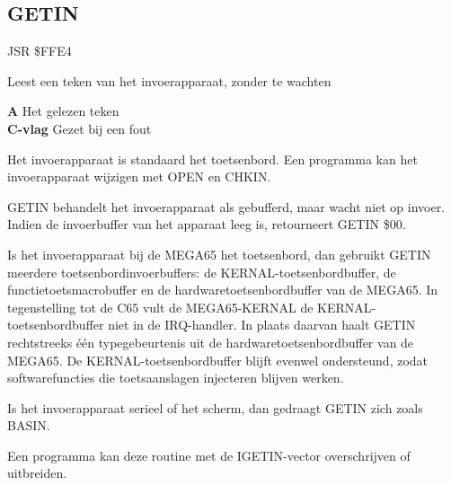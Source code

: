 \subsection{GETIN}
\label{KERNAL Jump Table!GETIN}
\begin{description}[leftmargin=2cm,style=nextline]
    \item [Adres:] JSR \$FFE4    \item [Omschrijving:] Leest een teken van het invoerapparaat, zonder te wachten    \item [Uitvoer:]        \textbf{A} Het gelezen teken \\        \textbf{C-vlag} Gezet bij een fout    \item [Opmerkingen:]        Het invoerapparaat is standaard het toetsenbord. Een programma kan het invoerapparaat wijzigen met OPEN en CHKIN.

        GETIN behandelt het invoerapparaat als gebufferd, maar wacht niet op invoer. Indien de invoerbuffer van het apparaat leeg is, retourneert GETIN \$00.

        Is het invoerapparaat bij de MEGA65 het toetsenbord, dan gebruikt GETIN meerdere toetsenbordinvoerbuffers: de KERNAL-toetsenbordbuffer, de functietoetsmacrobuffer en de hardwaretoetsenbordbuffer van de MEGA65. In tegenstelling tot de C65 vult de MEGA65-KERNAL de KERNAL-toetsenbordbuffer niet in de IRQ-handler. In plaats daarvan haalt GETIN rechtstreeks één typegebeurtenis uit de hardwaretoetsenbordbuffer van de MEGA65. De KERNAL-toetsenbordbuffer blijft evenwel ondersteund, zodat softwarefuncties die toetsaanslagen injecteren blijven werken.

        Is het invoerapparaat serieel of het scherm, dan gedraagt GETIN zich zoals BASIN.

        Een programma kan deze routine met de IGETIN-vector overschrijven of uitbreiden.    \item [Voorbeeld:]

\end{description}



\newpage

